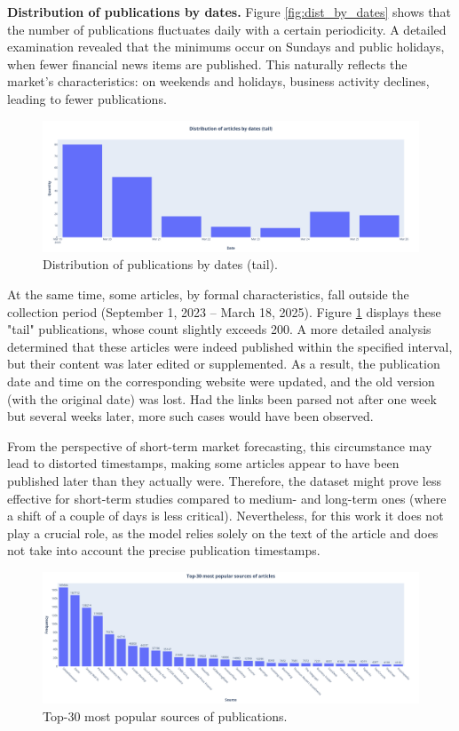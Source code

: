 \textbf{Distribution of publications by dates.} Figure \ref{fig:dist_by_dates} shows that the number of publications
fluctuates daily with a certain periodicity. A detailed examination revealed that the minimums occur on Sundays and
public holidays, when fewer financial news items are published. This naturally reflects the market’s characteristics:
on weekends and holidays, business activity declines, leading to fewer publications.

\begin{figure}[H]
    \centering
    \includegraphics[width=1\linewidth]{img/articles_dist_by_dates_tail.png}
    \caption{\label{fig:dist_by_dates_tail}Distribution of publications by dates (tail).}
\end{figure}

At the same time, some articles, by formal characteristics, fall outside the collection period (September 1, 2023 – March 18, 2025).
Figure \ref{fig:dist_by_dates_tail} displays these "tail" publications, whose count slightly exceeds 200. A more detailed analysis
determined that these articles were indeed published within the specified interval, but their content was later edited or supplemented.
As a result, the publication date and time on the corresponding website were updated, and the old version (with the original date) was
lost. Had the links been parsed not after one week but several weeks later, more such cases would have been observed.

From the perspective of short-term market forecasting, this circumstance may lead to distorted timestamps, making some articles appear
to have been published later than they actually were. Therefore, the dataset might prove less effective for short-term studies compared
to medium- and long-term ones (where a shift of a couple of days is less critical). Nevertheless, for this work it does not play
a crucial role, as the model relies solely on the text of the article and does not take into account the precise publication timestamps.

\begin{figure}[H]
    \centering
    \includegraphics[width=1\linewidth]{img/top30_sources.png}
    \caption{\label{fig:dist_sources}Top-30 most popular sources of publications.}
\end{figure}

